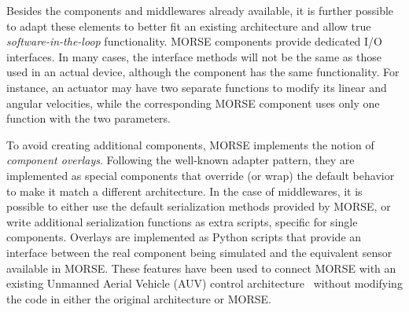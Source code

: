\documentclass{llncs}
\newcommand{\serge}[1]{\nb{Serge}{blue}{#1}}
\begin{document}

Besides the components and middlewares already available, it is
further possible to adapt these elements to better fit an existing
architecture and allow true \emph{software-in-the-loop} functionality.
MORSE components provide dedicated I/O interfaces. In
many cases, the interface methods will not be the same as those used in an
actual device, although the component has the same functionality.
For instance, an actuator may have two separate functions to modify its linear
and angular velocities, while the corresponding MORSE component uses only one
function with the two parameters.

To avoid creating additional components,
MORSE implements the notion of \emph{component overlays}. Following
the well-known adapter pattern, they are implemented as
special components that override (or wrap) the default
behavior to make it match a different architecture.
In the case of middlewares, it is possible to either use the default
serialization methods provided by MORSE, or write additional serialization
functions as extra scripts, specific for single components.
Overlays are implemented as Python scripts that provide an interface between
the real component being simulated and the equivalent sensor available in
MORSE.
These features have been used to connect MORSE with an existing
Unmanned Aerial Vehicle (AUV) control architecture~\cite{barbier2011}
without modifying the code in either the original architecture or MORSE.
\end{document}
